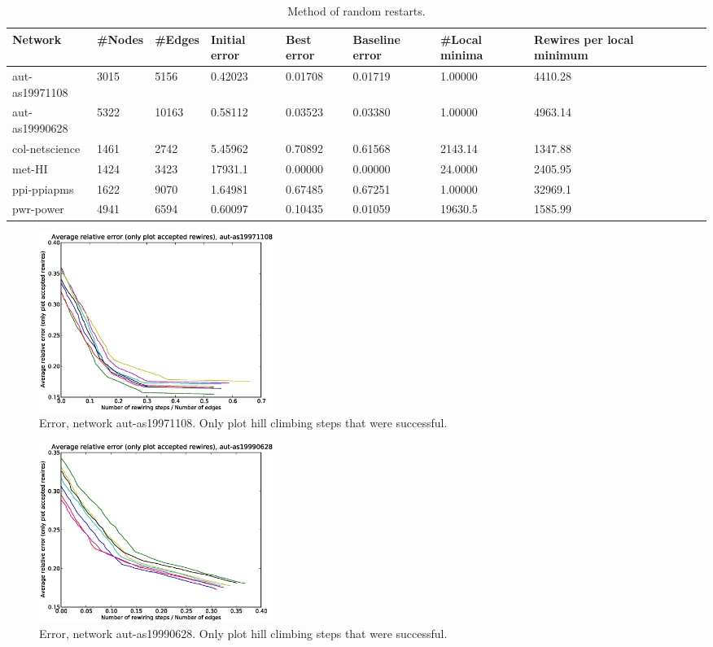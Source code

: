 \begin{table}[t]
\centering
\begin{tabular}{|l|l|l|l|l|l|l|l|l|l|}
\hline
Network & \#Nodes & \#Edges & Initial error & Best error & Baseline error & \#Local
minima & Rewires per local minimum\\\hline
aut-as19971108 & 3015 & 5156 & 0.42023& 0.01708& 0.01719& 1.00000 & 4410.28\\\hline
aut-as19990628 & 5322 & 10163 & 0.58112& 0.03523& 0.03380& 1.00000 & 4963.14\\\hline
col-netscience & 1461 & 2742 & 5.45962& 0.70892& 0.61568 & 2143.14& 1347.88\\\hline
met-HI & 1424 & 3423 & 17931.1& 0.00000 & 0.00000 & 24.0000 & 2405.95\\\hline
ppi-ppiapms & 1622 & 9070 & 1.64981& 0.67485& 0.67251& 1.00000 & 32969.1\\\hline
pwr-power & 4941 & 6594 & 0.60097& 0.10435& 0.01059& 19630.5& 1585.99\\\hline
\end{tabular}
\caption{Method of random restarts.}
\label{tb:random-restarts}
\end{table}

\begin{figure}[p]
\centering
\includegraphics[width=3in]{Figures/acceptedOnly-aut-as19971108.eps}
\caption{Error, network aut-as19971108.  Only plot hill climbing steps that were successful.}
\label{fig:errors-aut-as19971108}
\end{figure}

\begin{figure}[p]
\centering
\includegraphics[width=3in]{Figures/acceptedOnly-aut-as19990628.eps}
\caption{Error, network aut-as19990628.  Only plot hill climbing steps that were successful.}
\label{fig:errors-aut-as19990628}
\end{figure}

